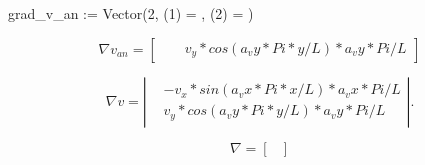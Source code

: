 grad_v_an := Vector(2, {(1) = , (2) = })


\begin{equation}

  \nabla v_{an} = \left[
\begin{split}

&

&v_y*cos(a_vy*Pi*y/L)*a_vy*Pi/L

 \end{split}
\right]
\end{equation}

\begin{equation}
\nabla v = \left| \begin{array}{c}
&  -v_x*sin(a_vx*Pi*x/L)*a_vx*Pi/L\\
&  v_y*cos(a_vy*Pi*y/L)*a_vy*Pi/L
\end{array} \right|.
\end{equation}

\begin{equation}
\nabla  = \left[ \begin{array}{c}

\end{array} \right]
\end{equation}
                  
